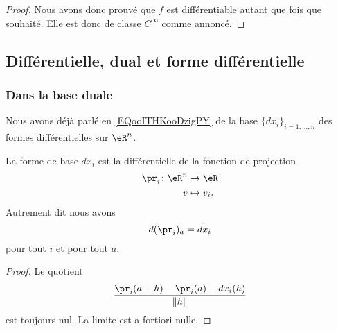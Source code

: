 \begin{proof}
    Nous avons donc prouvé que \( f\) est différentiable autant que fois que souhaité. Elle est donc de classe \(  C^{\infty}\) comme annoncé.
\end{proof}

\subsection{Différentielle, dual et forme différentielle}

\subsubsection{Dans la base duale}

Nous avons déjà parlé en \eqref{EQooITHKooDzigPY} de la base \( \{ dx_i \}_{i=1,\ldots, n}\) des formes différentielles sur \( \eR^n\).

\begin{proposition}
    La forme de base \( dx_i\) est la différentielle de la fonction de projection
    \begin{equation}
        \begin{aligned}
            \pr_i\colon \eR^n&\to \eR \\
            v&\mapsto v_i.
        \end{aligned}
    \end{equation}
    Autrement dit nous avons
    \begin{equation}
        d(\pr_i)_a=dx_i
    \end{equation}
    pour tout \( i\) et pour tout \( a\).
\end{proposition}

\begin{proof}
    Le quotient
    \begin{equation}
        \frac{ \pr_i(a+h)-\pr_i(a)-dx_i(h) }{ \| h \| }
    \end{equation}
    est toujours nul. La limite est a fortiori nulle.
\end{proof}

